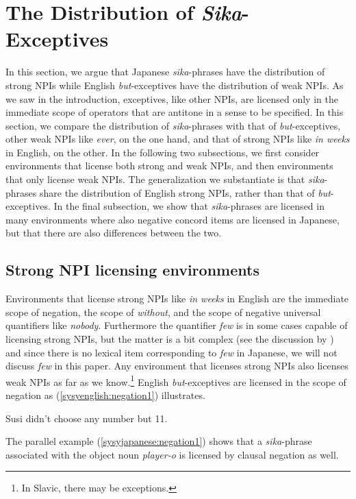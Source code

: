 \documentclass[output=paper,colorlinks,citecolor=brown,
]{langscibook}
\def\refp#1{(\ref{sy#1})}
\begin{document}
\section{The Distribution of \emph{Sika}-Exceptives}\label{sysc:data}

In this section, we argue that Japanese \emph{sika}-phrases have the distribution of strong NPIs while English \emph{but}-exceptives have the distribution of weak NPIs. As we  saw in the introduction, exceptives, like other NPIs, are licensed only in the immediate scope of operators that are antitone in a sense to be specified.
In this section, we compare the distribution of \emph{sika}-phrases with that of \emph{but}-exceptives, other weak NPIs like \emph{ever}, on the one hand, and that of strong NPIs like \emph{in weeks} in English, on the other.
In the following two subsections, we first consider environments that license both strong and weak NPIs, and then environments that only license weak NPIs.
The generalization we substantiate is that \emph{sika}-phrases share the distribution of English strong NPIs, rather than that of \emph{but}-exceptives. In the final subsection, we show that \emph{sika}-phrases are licensed in many environments where also negative concord items are licensed in Japanese, but that there are also differences between the two.




\subsection{Strong NPI licensing environments}

Environments that license strong NPIs like \emph{in weeks} in English are the immediate scope of negation, the scope of \emph{without}, and the scope of negative universal quantifiers like \emph{nobody}.  Furthermore the quantifier \emph{few} is in some cases capable of licensing strong NPIs, but the matter is a bit complex (see the discussion by \citealt{chierchia13a}) and since there is no  lexical item corresponding to \emph{few} in Japanese, we will not discuss \emph{few} in this paper. Any environment that licenses strong NPIs also licenses weak NPIs as far as we know.\footnote{In Slavic, there may be exceptions.}  English \emph{but}-exceptives are licensed in the scope of negation as \refp{syenglish:negation1} illustrates.

\ea \label{syenglish:negation1}
Susi didn't choose any number but 11.\z

The parallel example \refp{syjapanese:negation1} shows that a \emph{sika}-phrase associated with the object noun \emph{player-o} is licensed by clausal negation as well.  
\end{document}
